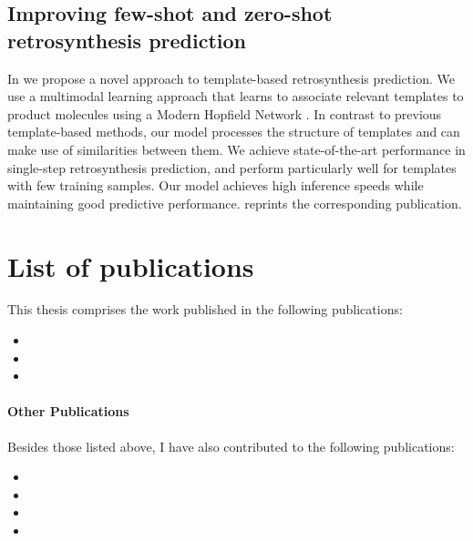 \subsection{Improving few-shot and zero-shot retrosynthesis prediction}
In \citet{seidlImprovingFewZeroShot2022} we propose a novel approach to template-based
retrosynthesis prediction. We use a multimodal learning approach that learns to associate relevant
templates to product molecules using a Modern Hopfield Network
\citep{ramsauerHopfieldNetworksAll2020}. In contrast to previous template-based methods, our model
processes the structure of templates and can make use of similarities between them. We achieve
state-of-the-art performance in single-step retrosynthesis prediction, and perform particularly well
for templates with few training samples. Our model achieves high inference speeds while maintaining
good predictive performance.  reprints the corresponding publication.

\section{List of publications\label{sec:publications}} This thesis comprises the work published in
the following publications:

\begin{itemize}
	\item {}
	\item {}
	\item {}
\end{itemize}

\paragraph{Other Publications} Besides those listed above, I have also contributed to the
following publications:

\begin{itemize}
	\item {}
	\item {}
	\item {}
	\item {}
\end{itemize}